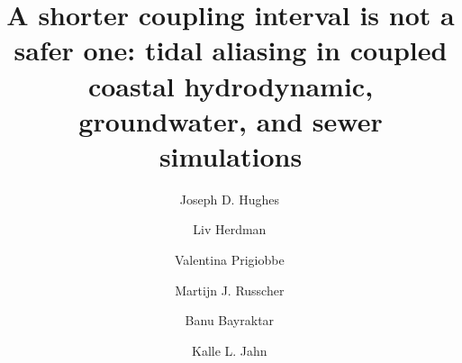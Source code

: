\documentclass[preprint,authoryear,11pt]{elsarticle}
\begin{document}
\begin{frontmatter}

%
\title{A shorter coupling interval is not a safer one: tidal aliasing in coupled
coastal hydrodynamic, groundwater, and sewer simulations}

\author[inst1,inst2]{Joseph D. Hughes\,}
\author[inst3]{Liv Herdman\,}
\author[inst4]{Valentina Prigiobbe\,}
\author[inst5]{Martijn J. Russcher\,}
\author[inst6]{Banu Bayraktar\,}
\author[inst3]{Kalle L. Jahn\,}


\end{frontmatter}
\end{document}
